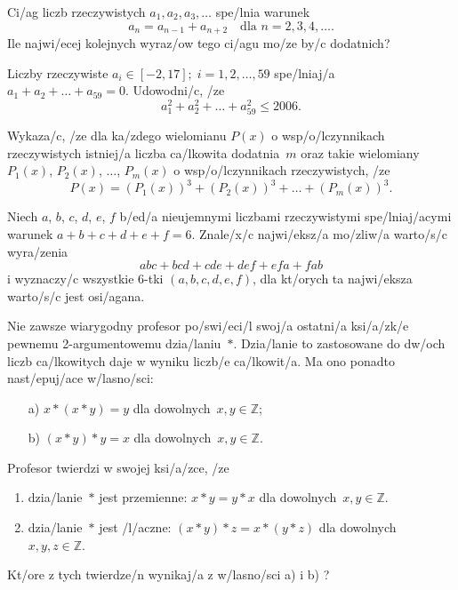 \documentclass{bw06}
\begin{document}
\maketitle

\begin{problems}

\item
  Ci/ag liczb rzeczywistych $a_1, a_2, a_3, \dots$ spe/lnia warunek
  \[a_n=a_{n-1}+a_{n+2} \quad \text{dla } n=2,3,4,\dots.\]
Ile najwi/ecej kolejnych wyraz/ow tego ci/agu mo/ze by/c dodatnich?
 
\item
  Liczby rzeczywiste
$a_i\in[-2, 17];\; i = 1, 2, \dots, 59$
spe/lniaj/a $a_1+a_2+\dots+a_{59}=0$.
Udowodni/c, /ze
\[a_1^2 + a_2^2 + \dots + a_{59}^2 \le 2006.\]

\item
Wykaza/c, /ze dla ka/zdego wielomianu 
 $P(x)$ o wsp/o/lczynnikach rzeczywistych
istniej/a liczba ca/lkowita dodatnia~$m$ oraz takie wielomiany 
$P_1(x)$, $P_2(x)$, $\ldots$, $P_m(x)$ o wsp/o/lczynnikach rzeczywistych,
/ze
\[P(x)=(P_1(x))^3+(P_2(x))^3+\ldots+(P_m(x))^3.\]

\item
Niech  $a$, $b$, $c$, $d$, $e$, $f$ b/ed/a nieujemnymi liczbami rzeczywistymi 
spe/lniaj/acymi warunek
 $a+b+c+d+e+f=6$. 
Znale/x/c najwi/eksz/a mo/zliw/a warto/s/c wyra/zenia
\[abc+bcd+cde+def+efa+fab\] 
i wyznaczy/c wszystkie 6-tki
$(a,b,c,d,e,f)$, dla kt/orych ta najwi/eksza warto/s/c jest osi/agana.

\item Nie zawsze wiarygodny profesor 
po/swi/eci/l swoj/a ostatni/a ksi/a/zk/e pewnemu 2-argumentowemu dzia/laniu~$*$. 
Dzia/lanie to zastosowane do dw/och liczb ca/lkowitych daje w wyniku liczb/e ca/lkowit/a.
Ma ono ponadto nast/epuj/ace w/lasno/sci:

  \begin{itemize}
    \item[a) ] $x*(x*y)=y$ dla dowolnych~$x,y \in \mathbb{Z}$;
    \item[b) ] $(x*y)*y=x$ dla dowolnych~$x,y \in \mathbb{Z}$.
  \end{itemize}
Profesor twierdzi w swojej ksi/a/zce, /ze 
  \begin{enumerate}
  \item dzia/lanie~$*$ jest przemienne:
    $x*y=y*x$ dla dowolnych~$x,y \in \mathbb{Z}$.
  \item dzia/lanie~$*$ jest /l/aczne:
    $(x*y)*z=x*(y*z)$ dla dowolnych~$x,y,z \in \mathbb{Z}$.
  \end{enumerate}
Kt/ore z tych twierdze/n wynikaj/a z w/lasno/sci a) i b) ?


\end{problems}
\end{document}
